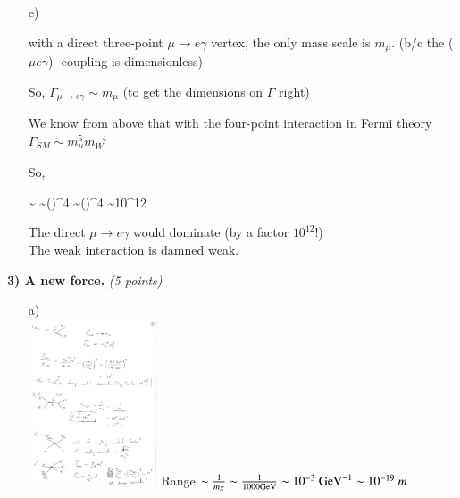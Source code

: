 {\begin{itemize}
{Now from c) 
\be
\Gamma_\tau \sim m_\tau^5
\ee

and we know
\bea
\tau_\mu = \Gamma_\mu^{-1}\\
\tau_\tau = \Gamma_\tau^{-1}
\eea

so, 

\be
\frac{\tau_\tau}{\tau_\mu} = \frac{\Gamma_\mu}{\Gamma_\tau}
\ee

$\Rightarrow$
\be
\tau_\tau = \tau_\mu \frac{\Gamma_\mu}{\Gamma_\tau} = \tau_\mu {} = \tau_\mu \left(\right)^5  = 1\mu s (10^{-1})^5 = 10^{-6} s ^{-5} = 10^{-11} s
\ee
}

\item[e)]{
with a direct three-point $\mu \rightarrow e \gamma$ vertex, the only mass scale is $m_\mu$. (b/c the ($\mu e \gamma$)- coupling  is dimensionless)

So, $\Gamma_{\mu\rightarrow e \gamma} \sim m_\mu$ (to get the dimensions on $\Gamma$ right)

We know from above that with the four-point interaction in Fermi theory $\Gamma_{SM} \sim m_\mu^5 m_W^{-4}$

So,

\be
{} \sim {} \sim \left(\right)^4 \sim \left(\right)^4  \sim 10^{12}
\ee

The direct $\mu \rightarrow e \gamma$ would dominate (by a factor  $10^{12}$!)\\
The weak interaction is damned weak.

}
\end{itemize}

\clearpage

%
%
\textbf{3) A new force. } \hfill \textit{(5 points)}\\

\begin{itemize}
\item[a)]{ ${ }$\\
\bc
\includegraphics[width=0.3\textwidth]{./eeXee.pdf}
\ec
Range $\sim \frac{1}{m_X} \sim \frac{1}{1000 \textrm{GeV}} \sim 10^{-3}\ \textrm{GeV}^{-1} \sim 10^{-19}\ m$
}


\end{itemize}}
